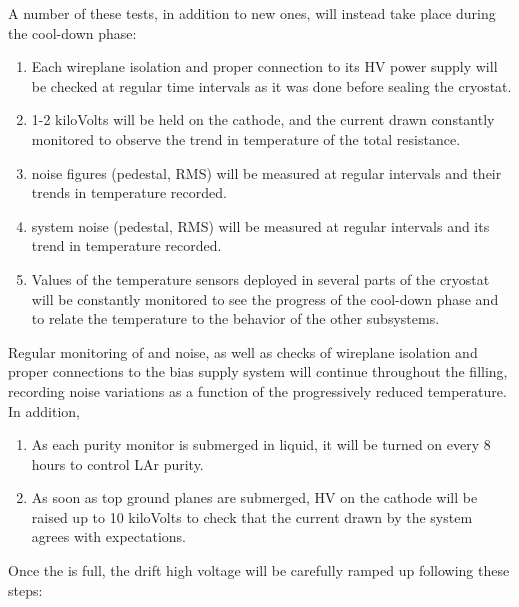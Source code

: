A number of these tests, in addition to new ones, will instead take place during the cool-down phase:

\begin{enumerate}


    \item Each  wireplane isolation and proper connection to its HV power supply will be checked at regular time intervals as it was done before sealing the cryostat.
    
    \item 1-2 kiloVolts will be held on the cathode, and the current drawn constantly monitored to observe the trend in temperature of the total resistance.
    
    \item {} noise figures (pedestal, RMS) will be measured at regular intervals and their trends in temperature recorded.
    
    \item {} system noise (pedestal, RMS) will be measured at regular intervals and its trend in temperature recorded.
    
     \item Values of the temperature sensors deployed in several parts of the cryostat will be constantly monitored to see the progress of the cool-down phase and to relate the temperature to the behavior of the other  subsystems. 
     
\end{enumerate}

Regular monitoring of  and  noise, as well as checks of wireplane isolation and proper connections to the bias supply system will continue throughout the filling, recording noise variations as a function of the progressively reduced temperature. In addition,

\begin{enumerate}

    \item As each purity monitor is submerged in liquid, it will be turned on every 8 hours to control LAr purity.
    
    \item As soon as top ground planes are submerged, HV on the cathode will be raised up to 10 kiloVolts to check that the current drawn by the system agrees with expectations.

\end{enumerate}

Once the  is full, the drift high voltage will be carefully ramped up following these steps:

